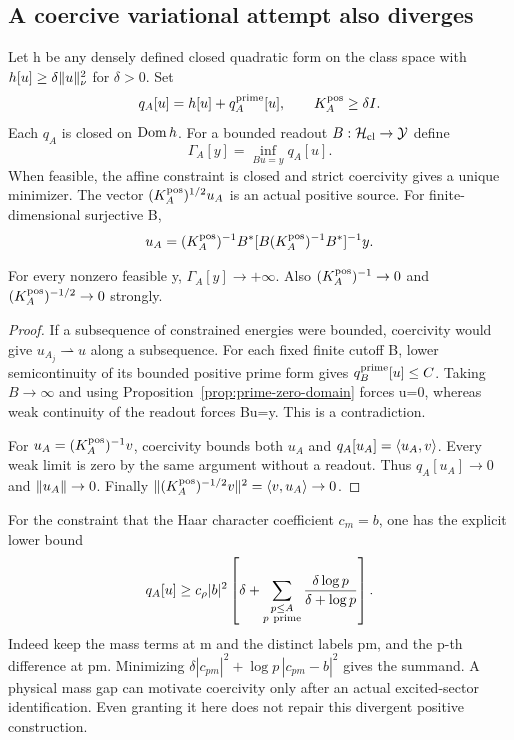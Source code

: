 \subsection{A coercive variational attempt also diverges}
Let h be any densely defined closed quadratic form on the class
space with $h[u]\ge\delta\lVert u\rVert_\nu^2$ for $\delta>0$.
Set
\begin{equation}
q_A[u]=h[u]+q_A^{\rm prime}[u],\qquad K_A^{\rm pos}\ge\delta I .
\end{equation}
Each $q_A$ is closed on $\operatorname{Dom} h$. For a bounded readout
$B:\mathcal H_{\rm cl}\to\mathcal Y$ define
\begin{equation}
\Gamma_A[y]=\inf_{Bu=y}q_A[u] .
\end{equation}
When feasible, the affine constraint is closed and strict
coercivity gives a unique minimizer. The vector
$(K_A^{\rm pos})^{1/2}u_A$ is an actual positive source.
For finite-dimensional surjective B,
\begin{equation}
u_A=(K_A^{\rm pos})^{-1}B^*
[B(K_A^{\rm pos})^{-1}B^*]^{-1}y .
\end{equation}

\begin{theorem}\label{thm:schur}
For every nonzero feasible y, $\Gamma_A[y]\to+\infty$.
Also $(K_A^{\rm pos})^{-1}\to0$ and
$(K_A^{\rm pos})^{-1/2}\to0$ strongly.
\end{theorem}
\begin{proof}
If a subsequence of constrained energies were bounded,
coercivity would give $u_{A_j}\rightharpoonup u$ along a
subsequence. For each fixed finite cutoff B, lower
semicontinuity of its bounded positive prime form gives
$q_B^{\rm prime}[u]\le C$. Taking $B\to\infty$ and using
Proposition~\ref{prop:prime-zero-domain} forces u=0, whereas
weak continuity of the readout forces Bu=y. This is a
contradiction.

For $u_A=(K_A^{\rm pos})^{-1}v$, coercivity bounds both
$u_A$ and $q_A[u_A]=\langle u_A,v\rangle$. Every weak limit is zero
by the same argument without a readout. Thus
$q_A[u_A]\to0$ and $\lVert u_A\rVert\to0$. Finally
$\lVert (K_A^{\rm pos})^{-1/2}v\rVert^2=\langle v,u_A\rangle\to0$.
\end{proof}
For the constraint that the Haar character coefficient $c_m=b$,
one has the explicit lower bound
\begin{equation}
q_A[u]\ge c_\rho|b|^2
\left[\delta+\sum_{\substack{p\le A\\p\ {\rm prime}}}
                       \frac{\delta\log p}{\delta+\log p}\right].
\end{equation}
Indeed keep the mass terms at m and the distinct labels pm,
and the p-th difference at pm. Minimizing
$\delta|c_{pm}|^2+\log p\,|c_{pm}-b|^2$ gives the summand.
A physical mass gap can motivate coercivity only after an
actual excited-sector identification. Even granting it here
does not repair this divergent positive construction.

